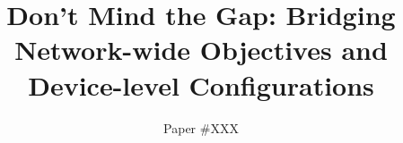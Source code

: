 \documentclass{sig-alternate-10pt}
\begin{document}
\setlength{\pdfpageheight}{\paperheight}
\setlength{\pdfpagewidth}{\paperwidth}

\title{Don't Mind the Gap:  Bridging Network-wide Objectives and Device-level Configurations}
\author{Paper \#XXX}

\maketitle







%


%






\end{document}

